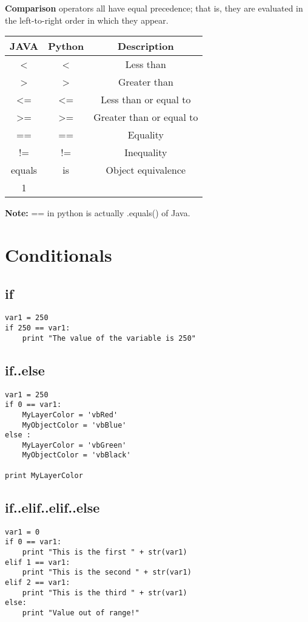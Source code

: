 \documentclass[a4paper,9pt]{extarticle}
\begin{document}
\begin{multicols*}{2}
\textbf{Comparison} operators all have equal precedence; that is, they are evaluated in the left-to-right order in which they appear.

\begin{center}
 \begin{tabular}{||c | c | c||}
 \hline
 \textbf{JAVA} & \textbf{Python} & \textbf{Description}\\ [1ex]
 \hline\hline
 < & < & Less than\\
 \hline
 > & > & Greater than\\
 \hline
 <= & <= & Less than or equal to \\
 \hline
  >= & >= & Greater than or equal to\\
 \hline
  == & == & Equality\\
 \hline
 != & != & Inequality\\
 \hline
 equals & is & Object equivalence \\
 \hline1
\end{tabular}
\end{center}
\textbf{Note: } == in python is actually .equals() of Java.
\vspace{5 mm}

\section{Conditionals}
\subsection{if}
\begin{lstlisting}
var1 = 250
if 250 == var1:
    print "The value of the variable is 250"
\end{lstlisting}

\subsection{if..else}
\begin{lstlisting}
var1 = 250
if 0 == var1:
    MyLayerColor = 'vbRed'
    MyObjectColor = 'vbBlue'
else :
    MyLayerColor = 'vbGreen'
    MyObjectColor = 'vbBlack'

print MyLayerColor
\end{lstlisting}

\subsection{if..elif..elif..else}
\begin{lstlisting}
var1 = 0
if 0 == var1:
    print "This is the first " + str(var1)
elif 1 == var1:
    print "This is the second " + str(var1)
elif 2 == var1:
    print "This is the third " + str(var1)
else:
    print "Value out of range!"
\end{lstlisting}



\end{multicols*}
\end{document}
